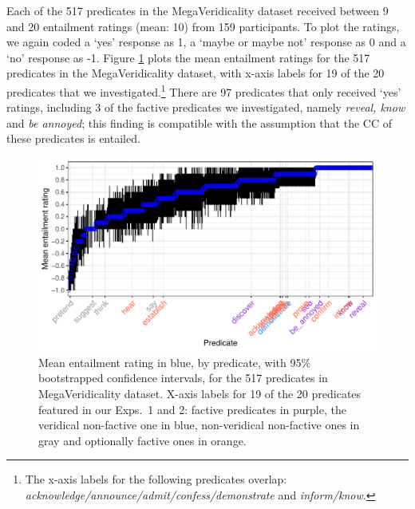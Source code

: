\documentclass[11pt,fleqn]{article}
\newcommand{\6}{\mbox{$[\hspace*{-.6mm}[$}}
\newcommand{\9}{\mbox{$]\hspace*{-.6mm}]$}}
\begin{document}
{Each of the 517 predicates in the MegaVeridicality dataset received between 9 and 20 entailment ratings (mean: 10) from 159 participants. To plot the ratings, we again coded a `yes' response as 1, a `maybe or maybe not' response as 0 and a `no' response as -1. Figure \ref{f-white-rawlins-ent} plots the mean entailment ratings for the 517 predicates in the MegaVeridicality dataset, with x-axis labels for 19 of the 20 predicates that we investigated.\footnote{The x-axis labels for the following predicates overlap: {\em acknowledge/announce/admit/confess/demonstrate} and {\em inform/know}.} There are 97 predicates that only received `yes' ratings, including 3 of the factive predicates we investigated, namely {\em reveal, know} and {\em be annoyed}; this finding is compatible with the assumption that the CC of these predicates is entailed. 

\begin{figure}[H]
\centering
\includegraphics[width=.75\paperwidth]{../white-rawlins-data/graphs/means-entailment-by-predicate}

\caption{Mean entailment rating in blue, by predicate, with 95\% bootstrapped confidence intervals, for the 517 predicates in MegaVeridicality dataset. X-axis labels for 19 of the 20 predicates featured in our Exps.~1 and 2: factive predicates in purple, the veridical non-factive one in blue, non-veridical non-factive ones in gray and optionally factive ones in orange.}
\label{f-white-rawlins-ent}
\end{figure}

}
\end{document}
